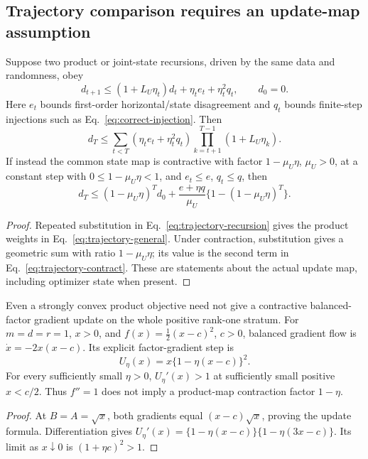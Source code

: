 \subsection{Trajectory comparison requires an update-map assumption}
\begin{theorem}
\label{thm:trajectory}
Suppose two product or joint-state recursions, driven by the same data and
randomness, obey
\begin{equation}
 d_{t+1}\leq(1+L_U\eta_t)d_t+\eta_t e_t+\eta_t^2 q_t,
 \qquad d_0=0.
 \label{eq:trajectory-recursion}
\end{equation}
Here $e_t$ bounds first-order horizontal/state disagreement and $q_t$
bounds finite-step injections such as Eq.~\eqref{eq:correct-injection}.
Then
\begin{equation}
 d_T\leq\sum_{t<T}(\eta_te_t+\eta_t^2q_t)
 \prod_{k=t+1}^{T-1}(1+L_U\eta_k).
 \label{eq:trajectory-general}
\end{equation}
If instead the common state map is contractive with factor
$1-\mu_U\eta$, $\mu_U>0$, at a constant step with
$0\leq1-\mu_U\eta<1$, and $e_t\leq e$, $q_t\leq q$, then
\begin{equation}
 d_T\leq(1-\mu_U\eta)^T d_0+
 \frac{e+\eta q}{\mu_U}\{1-(1-\mu_U\eta)^T\}.
 \label{eq:trajectory-contract}
\end{equation}
\end{theorem}
\begin{proof}
Repeated substitution in Eq.~\eqref{eq:trajectory-recursion} gives the
product weights in Eq.~\eqref{eq:trajectory-general}. Under contraction,
substitution gives a geometric sum with ratio $1-\mu_U\eta$; its value is
the second term in Eq.~\eqref{eq:trajectory-contract}. These are statements
about the actual update map, including optimizer state when present.
\end{proof}

\begin{proposition}
\label{prop:convex-counterexample}
Even a strongly convex product objective need not give a contractive
balanced-factor gradient update on the whole positive rank-one stratum.
For $m=d=r=1$, $x>0$, and $f(x)=\tfrac12(x-c)^2$, $c>0$, balanced
gradient flow is $\dot x=-2x(x-c)$. Its explicit factor-gradient step is
\begin{equation}
 U_\eta(x)=x\{1-\eta(x-c)\}^2.
\end{equation}
For every sufficiently small $\eta>0$, $U_\eta'(x)>1$ at sufficiently
small positive $x<c/2$. Thus $f''=1$ does not imply a product-map
contraction factor $1-\eta$.
\end{proposition}
\begin{proof}
At $B=A=\sqrt x$, both gradients equal $(x-c)\sqrt x$, proving the
update formula. Differentiation gives
$U_\eta'(x)=\{1-\eta(x-c)\}\{1-\eta(3x-c)\}$.
Its limit as $x\downarrow0$ is $(1+\eta c)^2>1$.
\end{proof}

